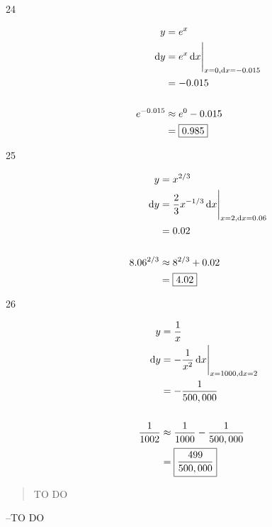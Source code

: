 \documentclass[letterpaper, landscape]{exam}
\newcommand{\dx}{\dif x}
\newcommand{\dy}{\dif y}
\begin{document}
\begin{description}
    \item[24]
      \begin{align*}
        y          & = e^x \\
        \dy        & =  \eval{ e^x \dx }_{x = 0, \dx = -0.015 } \\
                   & = -0.015 \\
        \\
        e^{-0.015} & \approx e^0 - 0.015 \\
                   & = \boxed{ 0.985 } \\
      \end{align*}

    \item[25]
      \begin{align*}
        y          & = x^{2/3} \\
        \dy        & =  \eval{ \frac{2}{3} x^{-1/3} \dx }_{x = 2, \dx = 0.06 } \\
                   & = 0.02 \\
        \\
        8.06^{2/3} & \approx 8^{2/3} + 0.02 \\
                   & = \boxed{ 4.02 } \\
      \end{align*}

    \item[26]
      \begin{align*}
        y              & = \frac{1}{x} \\
        \dy            & =  \eval{ - \frac{1}{x^2} \dx }_{x = 1000, \dx = 2 } \\
                       & = - \frac{1}{500,000} \\
        \\
        \frac{1}{1002} & \approx \frac{1}{1000} - \frac{1}{500,000} \\
                       & = \boxed{ \frac{499}{500,000} }
      \end{align*}

  \end{description}

  \else
    \vspace{10 cm}
    \begin{quote}
      \begin{em}
        TO DO
      \end{em}
    \end{quote}
    \hspace{2 cm} --TO DO
  \fi
\end{document}
